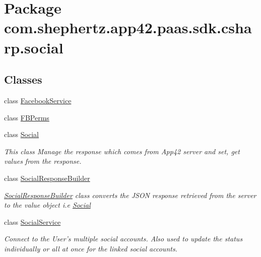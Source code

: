 \hypertarget{namespacecom_1_1shephertz_1_1app42_1_1paas_1_1sdk_1_1csharp_1_1social}{\section{Package com.\+shephertz.\+app42.\+paas.\+sdk.\+csharp.\+social}
\label{namespacecom_1_1shephertz_1_1app42_1_1paas_1_1sdk_1_1csharp_1_1social}
}
\subsection*{Classes}
\begin{DoxyCompactItemize}
\item 
class \hyperlink{classcom_1_1shephertz_1_1app42_1_1paas_1_1sdk_1_1csharp_1_1social_1_1_facebook_service}{Facebook\+Service}
\item 
class \hyperlink{classcom_1_1shephertz_1_1app42_1_1paas_1_1sdk_1_1csharp_1_1social_1_1_f_b_perms}{F\+B\+Perms}
\item 
class \hyperlink{classcom_1_1shephertz_1_1app42_1_1paas_1_1sdk_1_1csharp_1_1social_1_1_social}{Social}
\begin{DoxyCompactList}\small\item\em This class Manage the response which comes from App42 server and set, get values from the response. \end{DoxyCompactList}\item 
class \hyperlink{classcom_1_1shephertz_1_1app42_1_1paas_1_1sdk_1_1csharp_1_1social_1_1_social_response_builder}{Social\+Response\+Builder}
\begin{DoxyCompactList}\small\item\em \hyperlink{classcom_1_1shephertz_1_1app42_1_1paas_1_1sdk_1_1csharp_1_1social_1_1_social_response_builder}{Social\+Response\+Builder} class converts the J\+S\+O\+N response retrieved from the server to the value object i.\+e \hyperlink{classcom_1_1shephertz_1_1app42_1_1paas_1_1sdk_1_1csharp_1_1social_1_1_social}{Social} \end{DoxyCompactList}\item 
class \hyperlink{classcom_1_1shephertz_1_1app42_1_1paas_1_1sdk_1_1csharp_1_1social_1_1_social_service}{Social\+Service}
\begin{DoxyCompactList}\small\item\em Connect to the User's multiple social accounts. Also used to update the status individually or all at once for the linked social accounts. \end{DoxyCompactList}\end{DoxyCompactItemize}
